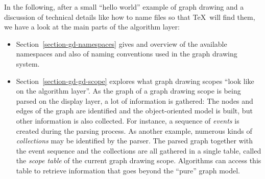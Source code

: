 In the following, after a small ``hello world'' example of graph drawing and a
discussion of technical details like how to name files so that \TeX\ will find
them, we have a look at the main parts of the algorithm layer:
%
\begin{itemize}
    \item Section~\ref{section-gd-namespaces} gives and overview of the
        available namespaces and also of naming conventions used in the graph
        drawing system.
    \item Section~\ref{section-gd-gd-scope} explores what graph drawing scopes
        ``look like on the algorithm layer''. As the graph of a graph drawing
        scope is being parsed on the display layer, a lot of information is
        gathered: The nodes and edges of the graph are identified and the
        object-oriented model is built, but other information is also
        collected. For instance, a sequence of \emph{events} is created during
        the parsing process. As another example, numerous kinds of
        \emph{collections} may be identified by the parser. The parsed graph
        together with the event sequence and the collections are all gathered
        in a single table, called the \emph{scope table} of the current graph
        drawing scope. Algorithms can access this table to retrieve information
        that goes beyond the ``pure'' graph model.


\end{itemize}
